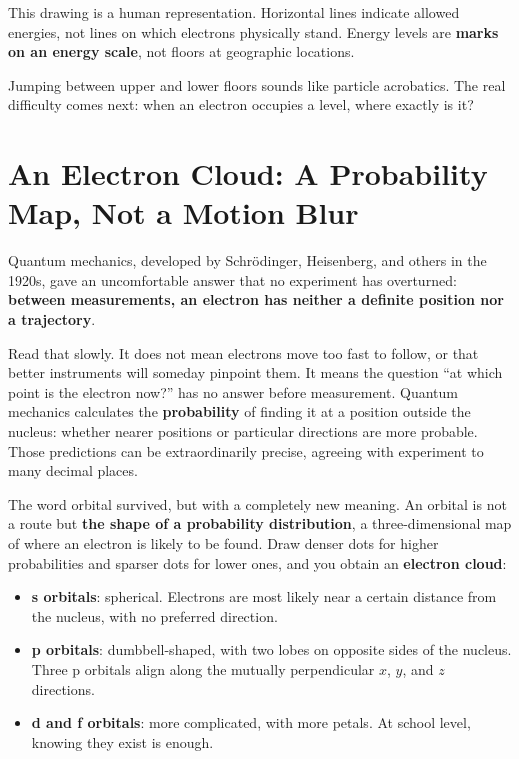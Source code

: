 
This drawing is a human representation. Horizontal lines indicate allowed energies, not lines on which electrons physically stand. Energy levels are \textbf{marks on an energy scale}, not floors at geographic locations.

Jumping between upper and lower floors sounds like particle acrobatics. The real difficulty comes next: when an electron occupies a level, where exactly is it?

\section{An Electron Cloud: A Probability Map, Not a Motion Blur}

Quantum mechanics, developed by Schrödinger, Heisenberg, and others in the 1920s, gave an uncomfortable answer that no experiment has overturned: \textbf{between measurements, an electron has neither a definite position nor a trajectory}.

Read that slowly. It does not mean electrons move too fast to follow, or that better instruments will someday pinpoint them. It means the question ``at which point is the electron now?'' has no answer before measurement. Quantum mechanics calculates the \textbf{probability} of finding it at a position outside the nucleus: whether nearer positions or particular directions are more probable. Those predictions can be extraordinarily precise, agreeing with experiment to many decimal places.

The word orbital survived, but with a completely new meaning. An orbital is not a route but \textbf{the shape of a probability distribution}, a three-dimensional map of where an electron is likely to be found. Draw denser dots for higher probabilities and sparser dots for lower ones, and you obtain an \textbf{electron cloud}:

\begin{itemize}[itemsep=2pt]
\item \textbf{s orbitals}: spherical. Electrons are most likely near a certain distance from the nucleus, with no preferred direction.
\item \textbf{p orbitals}: dumbbell-shaped, with two lobes on opposite sides of the nucleus. Three p orbitals align along the mutually perpendicular $x$, $y$, and $z$ directions.
\item \textbf{d and f orbitals}: more complicated, with more petals. At school level, knowing they exist is enough.
\end{itemize}

